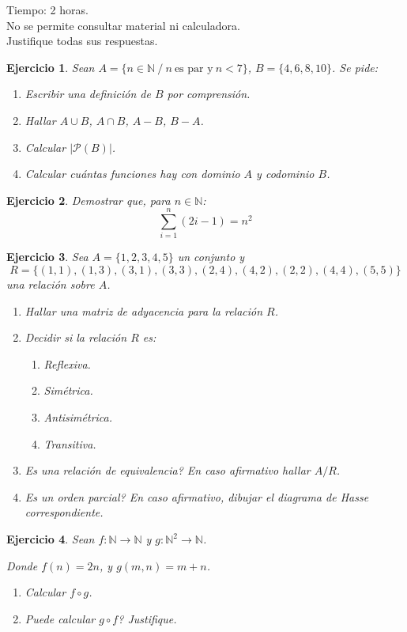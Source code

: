 \documentclass[14pt]{extarticle}
\newtheorem {Ejercicio}{Ejercicio}
\newenvironment{ejercicio}{\begin{Ejercicio} \rm}{\rm\end{Ejercicio}}
\begin{document}
\noindent
Tiempo: 2 horas.\\
No se permite consultar material ni calculadora.\\
Justifique todas sus respuestas.

\begin{ejercicio} \hfill \break
  Sean $A = \{ n \in \mathbb{N} \:/\:  n\:\mbox{es par y}\: n<7\}$,
  $B=\{4,6,8,10\}$. Se pide:
  \begin{enumerate}
  \item Escribir una definici\'on de $B$ por comprensi\'on.
  \item Hallar $A\cup B$, $A\cap B$, $A-B$, $B-A$.
  \item Calcular $|\mathcal{P}(B)|$.
  \item Calcular cu\'antas funciones hay con
    dominio $A$ y codominio $B$.
  \end{enumerate}
\end{ejercicio}

\begin{ejercicio}\hfill \break
  Demostrar que, para $n\in\mathbb{N}$:
  $$\sum_{i=1}^{n}{(2i-1)} = n^2$$
\end{ejercicio}


\ifdefined\accmod
\newpage
\fi

\begin{ejercicio}\hfill \break
  Sea $A=\{1,2,3,4,5\}$ un conjunto y
  $$R = \{(1,1),(1,3),(3,1),(3,3),(2,4),(4,2),(2,2),(4,4),(5,5)\}$$
  una relaci\'on sobre $A$.
  \begin{enumerate}
  \item Hallar una matriz de adyacencia para la relaci\'on $R$.
  \item Decidir si la relaci\'on $R$ es:
    \begin{enumerate}
    \item Reflexiva.
    \item Sim\'etrica.
    \item Antisim\'etrica.
    \item Transitiva.
    \end{enumerate}
  \item
    Es una relaci\'on de equivalencia? En caso afirmativo hallar
    $A/R$.
  \item
    Es un orden parcial? En caso afirmativo,
    dibujar el diagrama de Hasse correspondiente.
  \end{enumerate}
\end{ejercicio}



\begin{ejercicio}\hfill \break

  Sean $f:\mathbb{N}\rightarrow\mathbb{N}$
  y
  $g:\mathbb{N}^2\rightarrow\mathbb{N}$.
  
  Donde $f(n)=2n$, y $g(m,n)=m+n$.



  \begin{enumerate}
  \item
    Calcular $f \circ g$.
  \item
    Puede calcular $g \circ f$? Justifique.
  \end{enumerate}

\end{ejercicio}
\end{document}
